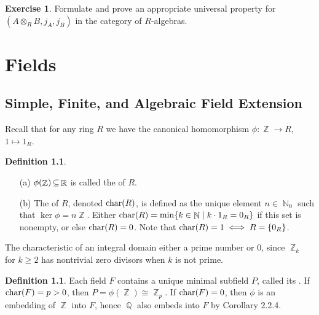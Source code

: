 \documentclass[11pt]{book}
\newcounter{counter}
\theoremstyle{definition}   \newtheorem{defn}[counter]{Definition} %
\newtheorem{exercise}[counter]{Exercise}
\DeclareMathOperator{\R}{\mathbb{R}}   \DeclareMathOperator{\N}{\mathbb{N}}   \DeclareMathOperator{\z}{\mathbb{Z}}   \DeclareMathOperator{\Q}{\mathbb{Q}}
\DeclareMathOperator{\ra}{\rightarrow}   \DeclareMathOperator{\Poly}{\mathbf{P}}   \DeclareMathOperator{\spn}{\textnormal{span}}   \DeclareMathOperator{\aut}{\textnormal{Aut}}
\newcommand{\vs}{\vspace{8pt}}
\numberwithin{counter}{chapter}
\begin{document}
\vs

\begin{exercise}
Formulate and prove an appropriate universal property for $(A \otimes_R B, j_A, j_B)$ in the category of $R$-algebras. 
\end{exercise}





\part{Fields}






\chapter{Simple, Finite, and Algebraic Field Extension}



Recall that for any ring $R$ we have the canonical homomorphism $\phi : \z \ra R$, $1 \mapsto 1_R$.

\begin{defn}\ 
\begin{enumerate}
\item[(a)] $\phi(\z) \sub \R$ is called the  of $R$.
\item[(b)] The \tb{characteristic} of $R$, denoted $\textnormal{char}(R)$, is defined as the unique element $n \in \N_0$ such that $\ker \phi = n\z$. Either $\tn{char}(R) = \min\{k \in \N \mid k \cdot 1_R = 0_R\}$ if this set is nonempty, or else $\textnormal{char}(R) = 0$. Note that $\textnormal{char}(R) = 1 \iff R = \{0_R\}$.
\end{enumerate}
\end{defn}

\vs

\begin{remark}
The characteristic of an integral domain either a prime number or $0$, since $\z_k$ for $k \geq 2$ has nontrivial zero divisors when $k$ is not prime.
\end{remark}

\vs

\begin{defn}
Each field $F$ contains a unique minimal subfield $P$, called its . If $\textnormal{char}(F) = p > 0$, then $P = \phi(\z) \cong \z_p$. If $\textnormal{char}(F) = 0$, then $\phi$ is an embedding of $\z$ into $F$, hence $\Q$ also embeds into $F$ by Corollary 2.2.4. 
\end{defn}
\end{document}
